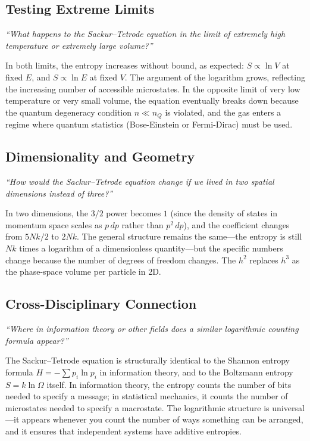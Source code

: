\subsection*{Testing Extreme Limits}
\textit{``What happens to the Sackur--Tetrode equation in the limit of extremely high temperature or extremely large volume?''}

In both limits, the entropy increases without bound, as expected: $S \propto \ln V$ at fixed $E$, and $S \propto \ln E$ at fixed $V$. The argument of the logarithm grows, reflecting the increasing number of accessible microstates. In the opposite limit of very low temperature or very small volume, the equation eventually breaks down because the quantum degeneracy condition $n \ll n_Q$ is violated, and the gas enters a regime where quantum statistics (Bose-Einstein or Fermi-Dirac) must be used.

\subsection*{Dimensionality and Geometry}
\textit{``How would the Sackur--Tetrode equation change if we lived in two spatial dimensions instead of three?''}

In two dimensions, the $3/2$ power becomes $1$ (since the density of states in momentum space scales as $p\,dp$ rather than $p^2\,dp$), and the coefficient changes from $5Nk/2$ to $2Nk$. The general structure remains the same---the entropy is still $Nk$ times a logarithm of a dimensionless quantity---but the specific numbers change because the number of degrees of freedom changes. The $h^2$ replaces $h^3$ as the phase-space volume per particle in 2D.

\subsection*{Cross-Disciplinary Connection}
\textit{``Where in information theory or other fields does a similar logarithmic counting formula appear?''}

The Sackur--Tetrode equation is structurally identical to the Shannon entropy formula $H = -\sum p_i \ln p_i$ in information theory, and to the Boltzmann entropy $S = k\ln\Omega$ itself. In information theory, the entropy counts the number of bits needed to specify a message; in statistical mechanics, it counts the number of microstates needed to specify a macrostate. The logarithmic structure is universal---it appears whenever you count the number of ways something can be arranged, and it ensures that independent systems have additive entropies.


